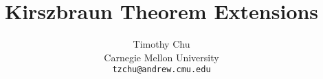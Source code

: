 


\title{Kirszbraun Theorem Extensions}
\author{
  Timothy Chu \\
  Carnegie Mellon University\\
  \texttt{tzchu@andrew.cmu.edu}
}

\setcounter{page}{0}
\maketitle
\thispagestyle{empty}
\begin{abstract}

\end{abstract}
\clearpage


\begin{appendix}
\end{appendix}

